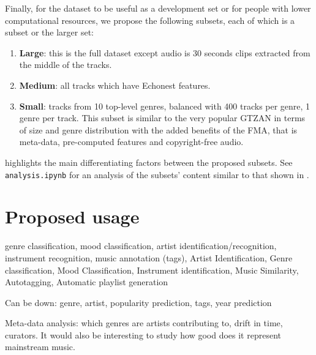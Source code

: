 \documentclass{article}
\begin{document}
Finally, for the dataset to be useful as a development set or for people with lower computational resources, we propose the following subsets, each of which is a subset or the larger set:
\begin{enumerate}
	\item \textbf{Large}: this is the full dataset except audio is 30 seconds clips extracted from the middle of the tracks.
	\item \textbf{Medium}: all tracks which have Echonest features.
	\item \textbf{Small}: tracks from 10 top-level genres, balanced with 400 tracks per genre, 1 genre per track. This subset is similar to the very popular GTZAN in terms of size and genre distribution with the added benefits of the FMA, that is meta-data, pre-computed features and copyright-free audio.
\end{enumerate}
 highlights the main differentiating factors between the proposed subsets. See \texttt{analysis.ipynb} for an analysis of the subsets' content similar to that shown in .


\section{Proposed usage} %



genre classification, mood classification, artist identification/recognition, instrument recognition, music annotation (tags),
Artist Identification, Genre classification, Mood Classification, Instrument identification, Music Similarity, Autotagging, Automatic playlist generation

Can be down: genre, artist, popularity prediction, tags, year prediction


Meta-data analysis: which genres are artists contributing to, drift in time, curators.
It would also be interesting to study how good does it represent mainstream music.
\end{document}
